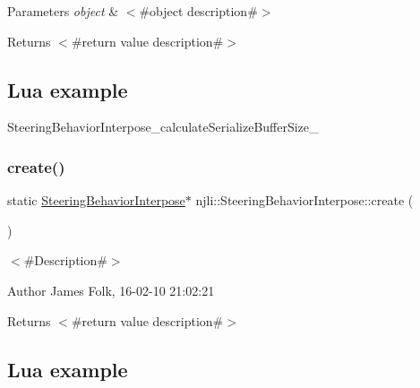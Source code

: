 \begin{DoxyParams}{Parameters}
{\em object} & $<$\#object description\#$>$\\
\hline
\end{DoxyParams}
\begin{DoxyReturn}{Returns}
$<$\#return value description\#$>$
\end{DoxyReturn}
\hypertarget{classnjli_1_1_steering_behavior_wander_ex1}{}\subsection{Lua example}\label{classnjli_1_1_steering_behavior_wander_ex1}

\begin{DoxyCodeInclude}
\end{DoxyCodeInclude}
Steering\+Behavior\+Interpose\+\_\+calculate\+Serialize\+Buffer\+Size\+\_\+ \mbox{\label{classnjli_1_1_steering_behavior_interpose_a72a13c389235c9c38841563ece871812}} 
\subsubsection{\texorpdfstring{create()}{create()}\hspace{0.1cm}{\footnotesize\ttfamily [1/2]}}
{\footnotesize\ttfamily static \mbox{\hyperlink{classnjli_1_1_steering_behavior_interpose}{Steering\+Behavior\+Interpose}}$\ast$ njli\+::\+Steering\+Behavior\+Interpose\+::create (\begin{DoxyParamCaption}{ }\end{DoxyParamCaption})\hspace{0.3cm}{\ttfamily [static]}}



$<$\#\+Description\#$>$ 

\begin{DoxyAuthor}{Author}
James Folk, 16-\/02-\/10 21\+:02\+:21
\end{DoxyAuthor}
\begin{DoxyReturn}{Returns}
$<$\#return value description\#$>$
\end{DoxyReturn}
\hypertarget{classnjli_1_1_steering_behavior_wander_ex1}{}\subsection{Lua example}\label{classnjli_1_1_steering_behavior_wander_ex1}

